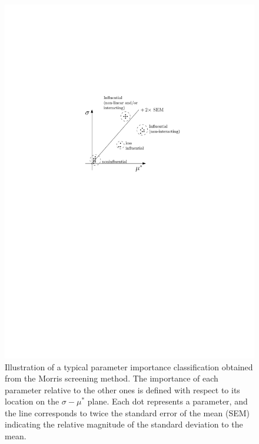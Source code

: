 \begin{figure}[bth]
	\centering
	\includegraphics[scale=0.80]{../figures/chapter3/ipe/importance_classification}
	\caption[Illustration of a typical parameter importance classification based on Morris screening method]{Illustration of a typical parameter importance classification obtained from the Morris screening method. The importance of each parameter relative to the other ones is defined with respect to its location on the $\sigma - \mu^*$ plane. Each dot represents a parameter, and the line corresponds to twice the standard error of the mean (SEM) indicating the relative magnitude of the standard deviation to the mean.}\label{fig:ch3_importance_classification}
\end{figure}
